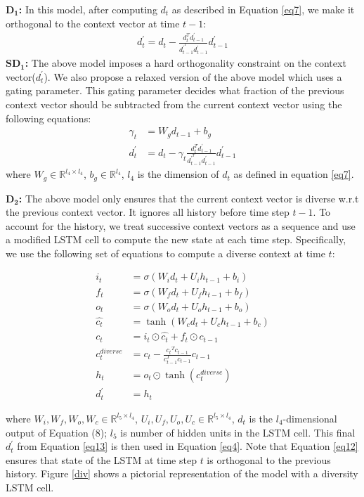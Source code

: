 \documentclass[11pt]{article}
\begin{document}
\noindent\textbf{$\mathbf{D_1}$:} In this model, after computing $d_t$ as described in Equation \eqref{eq7}, we make it orthogonal to the context vector at time $t-1$:
\begin{align}
d_t^{'} = d_t - \frac{d_t^T d_{t-1}^{'}}{d_{t-1}^{'^T}d_{t-1}^{'}} d_{t-1}^{'}
\end{align}
\noindent\textbf{$\mathbf{SD_1}$:} The above model imposes a hard orthogonality constraint on the context vector($d_t^{'}$). We also propose a relaxed version of the above model which uses a gating parameter. This gating parameter decides what fraction of the previous context vector should be subtracted from the current context vector using the following equations:
\begin{align}
\nonumber \gamma_{t} &= W_{g}d_{t-1} + b_{g} \\
\nonumber d_t^{'} &= d_t - \gamma_{t} \frac{d_t^T d_{t-1}^{'}}{d_{t-1}^{'^T}d_{t-1}^{'}} d_{t-1}^{'}
\end{align}
where $W_{g} \in \mathbb{R}^{l_4 \times l_4}$, $b_{g} \in \mathbb{R}^{l_4}$, ${l_4}$ is the dimension of $d_t$ as defined in equation \eqref{eq7}.

\noindent\textbf{$\mathbf{D_2}$:} The above model only ensures that the current context vector is diverse w.r.t the previous context vector. It ignores all history before time step $t-1$. To account for the history, we treat successive context vectors as a sequence and use a modified LSTM cell   to compute the new state at each time step. Specifically, we use the following set of equations to compute a diverse context at time $t$:

\begin{align}
\label{eq12}
\nonumber i_t &= \sigma(W_{i}d_{t} + U_{i}h_{t-1} +b_{i})\\
\nonumber f_t &= \sigma(W_{f}d_{t} + U_{f}h_{t-1} +b_{f}) \\
\nonumber o_t &= \sigma(W_{o}d_{t} + U_{o}h_{t-1} +b_{o})\\
\nonumber \hat{c_t} &= \tanh(W_{c}d_{t} + U_{c}h_{t-1} +b_{c})\\
\nonumber {c_t} &= i_{t}\odot\hat{c_t} + f_{t}\odot c_{t-1} \\
c_t^{diverse} &= {c_t} - \frac{{c_t}^T c_{t-1}}{c_{t-1}^{T}c_{t-1}} c_{t-1}\\
\nonumber h_t &= o_{t}\odot \tanh(c_t^{diverse}) \\
\label{eq13} d_t^{'} &= h_t
\end{align}

where $W_{i}, W_{f}, W_{o}, W_{c} \in \mathbb{R}^{l_{5} \times l_{4}}$, $U_{i}, U_{f}, U_{o}, U_{c} \in \mathbb{R}^{l_{5} \times l_{4}}$, $d_{t}$ is the $l_{4}$-dimensional output of Equation (8); $l_{5}$ is number of hidden units in the LSTM cell. This final $d_t^{'}$ from Equation \eqref{eq13} is then used in Equation \eqref{eq4}. Note that Equation \eqref{eq12} ensures that state of the LSTM at time step $t$ is orthogonal to the previous history. Figure \ref{div} shows a pictorial representation of the model with a diversity LSTM cell.
\end{document}
